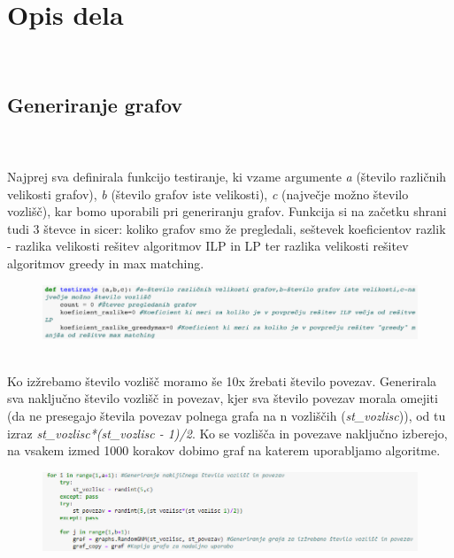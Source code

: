 \documentclass[12pt,a4paper]{amsart}
\theoremstyle{definition} %
\theoremstyle{plain} %
\begin{document}

\newpage

\section{Opis dela}
\

\subsection{Generiranje grafov}
\
\\
\\
Najprej sva definirala funkcijo testiranje, ki vzame argumente \textit{a} (število različnih velikosti grafov), \textit{b} (število grafov iste velikosti), \textit{c} (največje možno število vozlišč), kar bomo uporabili pri generiranju grafov. Funkcija si na začetku shrani tudi 3 števce in sicer: koliko grafov smo že pregledali, seštevek koeficientov razlik - razlika velikosti rešitev algoritmov ILP in LP ter razlika velikosti rešitev algoritmov greedy in max matching. 




\begin{figure}[ht]
\centering
\includegraphics[width=1\textwidth]{Screen2.png}
\end{figure}


 \hspace*{\fill} %
\\
Ko izžrebamo število vozlišč moramo še 10x žrebati število povezav. Generirala sva naključno število vozlišč in povezav, kjer sva število povezav morala omejiti (da ne presegajo števila povezav polnega grafa na n vozliščih (\textit{st\_vozlisc})), od tu izraz \textit{st\_vozlisc*(st\_vozlisc - 1)/2}. Ko se vozlišča in povezave naključno izberejo, na vsakem izmed 1000 korakov dobimo graf na katerem uporabljamo algoritme.


\begin{figure}[ht]
\centering
\includegraphics[width=1\textwidth]{Screen3.png}
\end{figure}
\end{document}
